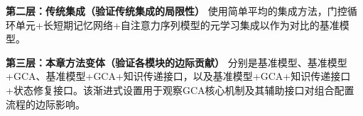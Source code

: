 


\textbf{第二层：传统集成（验证传统集成的局限性）}
使用简单平均的集成方法，门控循环单元+长短期记忆网络+自注意力序列模型的元学习集成以作为对比的基准模型。

\textbf{第三层：本章方法变体（验证各模块的边际贡献）}
分别是基准模型、基准模型+GCA、基准模型+GCA+知识传递接口，以及基准模型+GCA+知识传递接口+状态修复接口。该渐进式设置用于观察GCA核心机制及其辅助接口对组合配置流程的边际影响。

